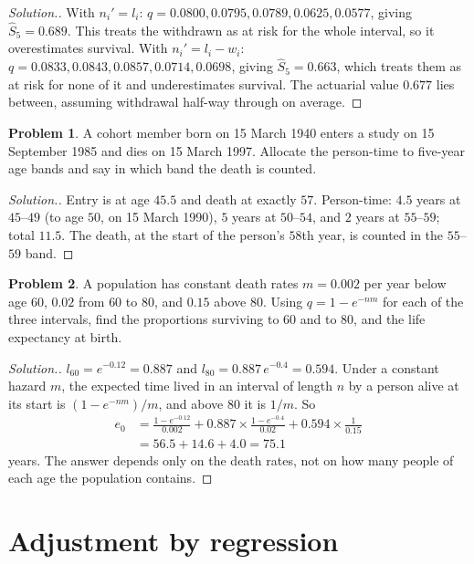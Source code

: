 \documentclass[11pt,a4paper]{article}
\numberwithin{equation}{section}
\theoremstyle{definition}
\newtheorem{problemx}{Problem}[subsection]
\newenvironment{problem}{\begin{problemx}}{\end{problemx}}
\newenvironment{solution}
  {\renewcommand{\qedsymbol}{}\begin{proof}[\textit{Solution}.]}
  {\end{proof}}
\begin{document}
\begin{solution}
With $n_i' = l_i$: $q = 0.0800, 0.0795, 0.0789, 0.0625, 0.0577$, giving $\hat S_5 = 0.689$. This treats the withdrawn as at risk for the whole interval, so it
overestimates survival. With $n_i' = l_i - w_i$: $q = 0.0833, 0.0843, 0.0857, 0.0714, 0.0698$, giving $\hat S_5 = 0.663$, which treats them as at risk for none of it and
underestimates survival. The actuarial value $0.677$ lies between, assuming withdrawal half-way through on average.
\end{solution}

\begin{problem}
A cohort member born on 15 March 1940 enters a study on 15 September 1985 and dies on 15 March 1997. Allocate the person-time to five-year
age bands and say in which band the death is counted.
\end{problem}

\begin{solution}
Entry is at age $45.5$ and death at exactly $57$. Person-time: $4.5$ years at $45$--$49$ (to age $50$, on 15 March 1990), $5$ years at $50$--$54$, and $2$
years at $55$--$59$; total $11.5$. The death, at the start of the person's $58$th year, is counted in the $55$--$59$ band.
\end{solution}

\begin{problem}
\label{prob:lifeexp}
A population has constant death rates $m = 0.002$ per year below age $60$, $0.02$ from $60$ to $80$, and $0.15$ above $80$. Using $q = 1 - e^{-nm}$ for each
of the three intervals, find the proportions surviving to $60$ and to $80$, and the life expectancy at birth.
\end{problem}

\begin{solution}
$l_{60} = e^{-0.12} = 0.887$ and $l_{80} = 0.887\,e^{-0.4} = 0.594$. Under a constant hazard $m$, the expected time lived in an interval of length $n$ by a person alive at its
start is $(1 - e^{-nm})/m$, and above $80$ it is $1/m$. So
\begin{align*}
e_0 &= \frac{1 - e^{-0.12}}{0.002} + 0.887 \times \frac{1 - e^{-0.4}}{0.02} + 0.594 \times \frac{1}{0.15} \\
&= 56.5 + 14.6 + 4.0 = 75.1
\end{align*}
years. The answer depends only on the death rates, not on how many people of each age the population contains.
\end{solution}

\section{Adjustment by regression}
\label{sec:regression}
\end{document}
